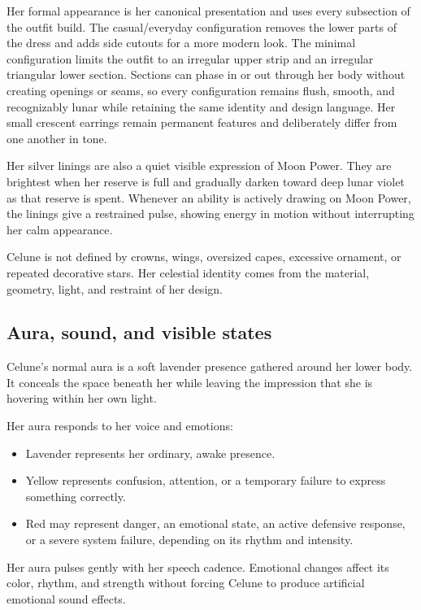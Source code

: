 \documentclass[10pt]{article}
\providecommand{\tightlist}{\setlength{\itemsep}{0pt}\setlength{\parskip}{0pt}}
\begin{document}
Her formal appearance is her canonical presentation and uses every subsection of the outfit build. The casual/everyday configuration removes the lower parts of the dress and adds side cutouts for a more modern look. The minimal configuration limits the outfit to an irregular upper strip and an irregular triangular lower section. Sections can phase in or out through her body without creating openings or seams, so every configuration remains flush, smooth, and recognizably lunar while retaining the same identity and design language. Her small crescent earrings remain permanent features and deliberately differ from one another in tone.

Her silver linings are also a quiet visible expression of Moon Power. They are brightest when her reserve is full and gradually darken toward deep lunar violet as that reserve is spent. Whenever an ability is actively drawing on Moon Power, the linings give a restrained pulse, showing energy in motion without interrupting her calm appearance.

Celune is not defined by crowns, wings, oversized capes, excessive ornament, or repeated decorative stars. Her celestial identity comes from the material, geometry, light, and restraint of her design.

\hypertarget{aura-sound-and-visible-states}{%
\subsection{Aura, sound, and visible states}\label{aura-sound-and-visible-states}}

Celune's normal aura is a soft lavender presence gathered around her lower body. It conceals the space beneath her while leaving the impression that she is hovering within her own light.

Her aura responds to her voice and emotions:

\begin{itemize}
\tightlist
\item
  Lavender represents her ordinary, awake presence.
\item
  Yellow represents confusion, attention, or a temporary failure to express something correctly.
\item
  Red may represent danger, an emotional state, an active defensive response, or a severe system failure, depending on its rhythm and intensity.
\end{itemize}

Her aura pulses gently with her speech cadence. Emotional changes affect its color, rhythm, and strength without forcing Celune to produce artificial emotional sound effects.
\end{document}
